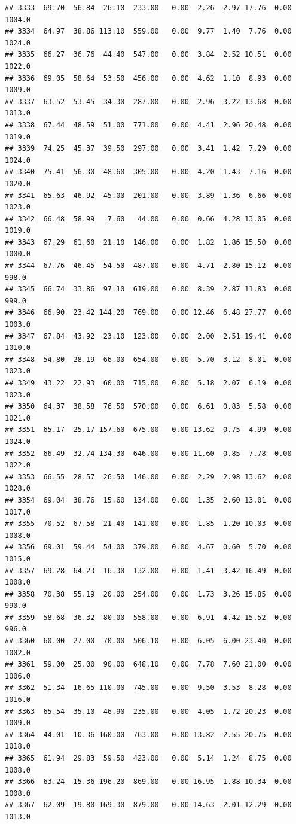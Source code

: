 \documentclass{article}\usepackage{graphicx, color}
\makeatletter
\newenvironment{kframe}{%
 \def\at@end@of@kframe{}%
 \ifinner\ifhmode%
  \def\at@end@of@kframe{\end{minipage}}%
  \begin{minipage}{\columnwidth}%
 \fi\fi%
 \def\FrameCommand##1{\hskip\@totalleftmargin \hskip-\fboxsep
 \colorbox{shadecolor}{##1}\hskip-\fboxsep
     \hskip-\linewidth \hskip-\@totalleftmargin \hskip\columnwidth}%
 \MakeFramed {\advance\hsize-\width
   \@totalleftmargin\z@ \linewidth\hsize
   \@setminipage}}%
 {\par\unskip\endMakeFramed%
 \at@end@of@kframe}
\newenvironment{knitrout}{}{} %
\makeatother
\begin{document}
\begin{knitrout}
\begin{kframe}
\begin{verbatim}
## 3333  69.70  56.84  26.10  233.00   0.00  2.26  2.97 17.76  0.00 1004.0
## 3334  64.97  38.86 113.10  559.00   0.00  9.77  1.40  7.76  0.00 1024.0
## 3335  66.27  36.76  44.40  547.00   0.00  3.84  2.52 10.51  0.00 1022.0
## 3336  69.05  58.64  53.50  456.00   0.00  4.62  1.10  8.93  0.00 1009.0
## 3337  63.52  53.45  34.30  287.00   0.00  2.96  3.22 13.68  0.00 1013.0
## 3338  67.44  48.59  51.00  771.00   0.00  4.41  2.96 20.48  0.00 1019.0
## 3339  74.25  45.37  39.50  297.00   0.00  3.41  1.42  7.29  0.00 1024.0
## 3340  75.41  56.30  48.60  305.00   0.00  4.20  1.43  7.16  0.00 1020.0
## 3341  65.63  46.92  45.00  201.00   0.00  3.89  1.36  6.66  0.00 1023.0
## 3342  66.48  58.99   7.60   44.00   0.00  0.66  4.28 13.05  0.00 1019.0
## 3343  67.29  61.60  21.10  146.00   0.00  1.82  1.86 15.50  0.00 1000.0
## 3344  67.76  46.45  54.50  487.00   0.00  4.71  2.80 15.12  0.00  998.0
## 3345  66.74  33.86  97.10  619.00   0.00  8.39  2.87 11.83  0.00  999.0
## 3346  66.90  23.42 144.20  769.00   0.00 12.46  6.48 27.77  0.00 1003.0
## 3347  67.84  43.92  23.10  123.00   0.00  2.00  2.51 19.41  0.00 1010.0
## 3348  54.80  28.19  66.00  654.00   0.00  5.70  3.12  8.01  0.00 1023.0
## 3349  43.22  22.93  60.00  715.00   0.00  5.18  2.07  6.19  0.00 1023.0
## 3350  64.37  38.58  76.50  570.00   0.00  6.61  0.83  5.58  0.00 1021.0
## 3351  65.17  25.17 157.60  675.00   0.00 13.62  0.75  4.99  0.00 1024.0
## 3352  66.49  32.74 134.30  646.00   0.00 11.60  0.85  7.78  0.00 1022.0
## 3353  66.55  28.57  26.50  146.00   0.00  2.29  2.98 13.62  0.00 1028.0
## 3354  69.04  38.76  15.60  134.00   0.00  1.35  2.60 13.01  0.00 1017.0
## 3355  70.52  67.58  21.40  141.00   0.00  1.85  1.20 10.03  0.00 1008.0
## 3356  69.01  59.44  54.00  379.00   0.00  4.67  0.60  5.70  0.00 1015.0
## 3357  69.28  64.23  16.30  132.00   0.00  1.41  3.42 16.49  0.00 1008.0
## 3358  70.38  55.19  20.00  254.00   0.00  1.73  3.26 15.85  0.00  990.0
## 3359  58.68  36.32  80.00  558.00   0.00  6.91  4.42 15.52  0.00  996.0
## 3360  60.00  27.00  70.00  506.10   0.00  6.05  6.00 23.40  0.00 1002.0
## 3361  59.00  25.00  90.00  648.10   0.00  7.78  7.60 21.00  0.00 1006.0
## 3362  51.34  16.65 110.00  745.00   0.00  9.50  3.53  8.28  0.00 1016.0
## 3363  65.54  35.10  46.90  235.00   0.00  4.05  1.72 20.23  0.00 1009.0
## 3364  44.01  10.36 160.00  763.00   0.00 13.82  2.55 20.75  0.00 1018.0
## 3365  61.94  29.83  59.50  423.00   0.00  5.14  1.24  8.75  0.00 1008.0
## 3366  63.24  15.36 196.20  869.00   0.00 16.95  1.88 10.34  0.00 1008.0
## 3367  62.09  19.80 169.30  879.00   0.00 14.63  2.01 12.29  0.00 1013.0

\end{verbatim}
\end{kframe}
\end{knitrout}
\end{document}
